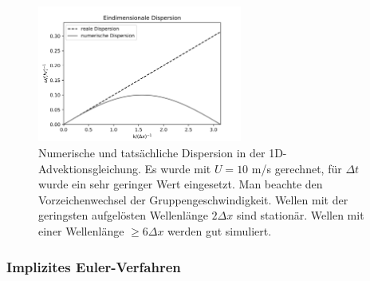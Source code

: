 \documentclass{book}
\begin{document}
\begin{figure}
\begin{center}
\includegraphics[width = 0.6\textwidth]{figs/dispersion_1d.png}
\caption{Numerische und tatsächliche Dispersion in der 1D-Advektionsgleichung. Es wurde mit $U = 10$ m/s gerechnet, für $\Delta t$ wurde ein sehr geringer Wert eingesetzt. Man beachte den Vorzeichenwechsel der Gruppengeschwindigkeit. Wellen mit der geringsten aufgelösten Wellenlänge $2\Delta x$ sind stationär. Wellen mit einer Wellenlänge $\geq 6\Delta x$ werden gut simuliert.}
\label{fig:disp_1d}
\end{center}
\end{figure}

\subsubsection{Implizites Euler-Verfahren}
\label{sec:implizites_euler-verfahren}
\end{document}
